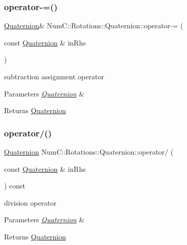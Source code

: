 \subsubsection{\texorpdfstring{operator-\/=()}{operator-=()}}
{\footnotesize\ttfamily \mbox{\hyperlink{class_num_c_1_1_rotations_1_1_quaternion}{Quaternion}}\& Num\+C\+::\+Rotations\+::\+Quaternion\+::operator-\/= (\begin{DoxyParamCaption}\item[{const \mbox{\hyperlink{class_num_c_1_1_rotations_1_1_quaternion}{Quaternion}} \&}]{in\+Rhs }\end{DoxyParamCaption})\hspace{0.3cm}{\ttfamily [inline]}}

subtraction assignment operator


\begin{DoxyParams}{Parameters}
{\em \mbox{\hyperlink{class_num_c_1_1_rotations_1_1_quaternion}{Quaternion}}} & \\
\hline
\end{DoxyParams}
\begin{DoxyReturn}{Returns}
\mbox{\hyperlink{class_num_c_1_1_rotations_1_1_quaternion}{Quaternion}} 
\end{DoxyReturn}
\mbox{\label{class_num_c_1_1_rotations_1_1_quaternion_a765710c6c32b22f4ae19ea0f77ae668e}} 
\subsubsection{\texorpdfstring{operator/()}{operator/()}}
{\footnotesize\ttfamily \mbox{\hyperlink{class_num_c_1_1_rotations_1_1_quaternion}{Quaternion}} Num\+C\+::\+Rotations\+::\+Quaternion\+::operator/ (\begin{DoxyParamCaption}\item[{const \mbox{\hyperlink{class_num_c_1_1_rotations_1_1_quaternion}{Quaternion}} \&}]{in\+Rhs }\end{DoxyParamCaption}) const\hspace{0.3cm}{\ttfamily [inline]}}

division operator


\begin{DoxyParams}{Parameters}
{\em \mbox{\hyperlink{class_num_c_1_1_rotations_1_1_quaternion}{Quaternion}}} & \\
\hline
\end{DoxyParams}
\begin{DoxyReturn}{Returns}
\mbox{\hyperlink{class_num_c_1_1_rotations_1_1_quaternion}{Quaternion}} 
\end{DoxyReturn}
\mbox{\label{class_num_c_1_1_rotations_1_1_quaternion_a2c8655a47ce6f85b0c181e257bc519ed}} 
